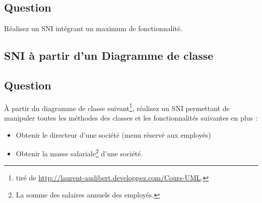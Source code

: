 \documentclass[12pt]{article}
\def\dc{\textsf{diagramme de classe}}
\def\sni{\textsf{SNI}}
\begin{document}
\subsection*{Question}

Réalisez un \sni{} intégrant un maximum de fonctionnalité.

\begin{center}
\fbox{
  \begin{minipage}{6in}
    \hfill\vspace{6in}
  \end{minipage}
}
\end{center}

\subsection{SNI à partir d'un Diagramme de classe}

\subsection*{Question}

\`A partir du \dc{} suivant\footnote{tiré de \url{http://laurent-audibert.developpez.com/Cours-UML}.}, réalisez un
 \sni{} permettant de manipuler toutes les méthodes des classes et les fonctionnalités suivantes en plus :
 
 \begin{itemize}
 \item Obtenir le directeur d'une société (menu réservé aux employés)
 \item Obtenir la masse salariale\footnote{La somme des salaires annuels des employés.} d'une société.
 \end{itemize}

\begin{center}
\end{center}
\end{document}
